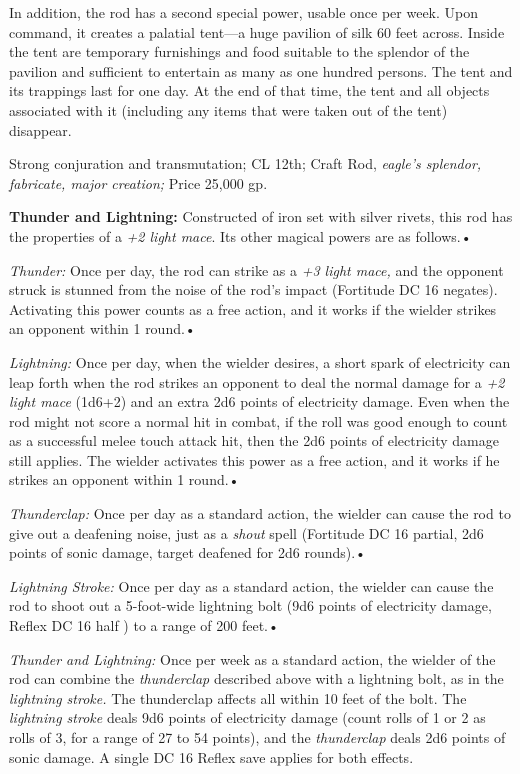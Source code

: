 \documentclass{article}
\begin{document}
In addition, the rod has a second special power, usable once per week. Upon command, 
it creates a palatial tent---a huge pavilion of silk 60 feet across. Inside the 
tent are temporary furnishings and food suitable to the splendor of the pavilion 
and sufficient to entertain as many as one hundred persons. The tent and its trappings 
last for one day. At the end of that time, the tent and all objects associated 
with it (including any items that were taken out of the tent) disappear.

Strong conjuration and transmutation; CL 12th; Craft Rod, \textit{eagle's splendor, 
fabricate, major creation; }Price 25,000 gp.

\textbf{Thunder and Lightning: }Constructed of iron set with silver rivets, this 
rod has the properties of a \textit{+2 light mace}. Its other magical powers are 
as follows.• 

\textit{Thunder: }Once per day, the rod can strike as a \textit{+3 light mace, 
}and the opponent struck is stunned from the noise of the rod's impact (Fortitude 
DC 16 negates). Activating this power counts as a free action, and it works if 
the wielder strikes an opponent within 1 round.• 

\textit{Lightning: }Once per day, when the wielder desires, a short spark of electricity 
can leap forth when the rod strikes an opponent to deal the normal damage for a 
\textit{+2 light mace }(1d6+2) and an extra 2d6 points of electricity damage. Even 
when the rod might not score a normal hit in combat, if the roll was good enough 
to count as a successful melee touch attack hit, then the 2d6 points of electricity 
damage still applies. The wielder activates this power as a free action, and it 
works if he strikes an opponent within 1 round.• 

\textit{Thunderclap: }Once per day as a standard action, the wielder can cause 
the rod to give out a deafening noise, just as a \textit{shout }spell (Fortitude 
DC 16 partial, 2d6 points of sonic damage, target deafened for 2d6 rounds).• 

\textit{Lightning Stroke: }Once per day as a standard action, the wielder can cause 
the rod to shoot out a 5-foot-wide lightning bolt (9d6 points of electricity damage, 
Reflex DC 16 half ) to a range of 200 feet.• 

\textit{Thunder and Lightning: }Once per week as a standard action, the wielder 
of the rod can combine the \textit{thunderclap }described above with a lightning 
bolt, as in the \textit{lightning stroke. }The thunderclap affects all within 10 
feet of the bolt. The \textit{lightning stroke }deals 9d6 points of electricity 
damage (count rolls of 1 or 2 as rolls of 3, for a range of 27 to 54 points), and 
the \textit{thunderclap }deals 2d6 points of sonic damage. A single DC 16 Reflex 
save applies for both effects.
\end{document}
